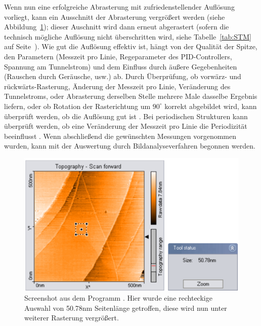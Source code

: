Wenn nun eine erfolgreiche Abrasterung mit zufriedenstellender
Auflösung vorliegt, kann ein Ausschnitt der Abrasterung
vergrößert werden (siehe Abbildung~\ref{fig:zoom});
dieser Auschnitt wird dann erneut abgerastert
(sofern die technisch mögliche Auflösung nicht überschritten wird,
siehe Tabelle~\ref{tab:STM} auf Seite~\pageref{tab:STM}).
Wie gut die Auflösung effektiv ist, hängt von der Qualität der 
Spitze, den Parametern (Messzeit pro Linie, Regeparameter des
PID-Controllers, Spannung am Tunnelstrom) und dem Einfluss durch
äußere Gegebenheiten (Rauschen durch Geräusche, usw.) ab. 
Durch Überprüfung, ob vorwärz- und rückwärts-Rasterung,
Änderung der Messzeit pro Linie, Veränderung des Tunnelstroms,
oder Abrasterung derselben Stelle mehrere Male  
dasselbe Ergebnis liefern, oder ob Rotation der Rasterichtung
um $90^{\circ}$ korrekt abgebildet wird, kann überprüft werden,
ob die Auflösung gut ist \cite{versuchsanleitung}.
Bei periodischen Strukturen kann überprüft werden, ob eine
Veränderung der Messzeit pro Linie die Periodizität beeinflusst
\cite{versuchsanleitung}. Wenn abschließend die gewünschten
Messungen vorgenommen wurden, kann mit der Auswertung 
durch Bildanalyseverfahren begonnen werden. 
\begin{figure}
\includegraphics[width=14cm]{pics/zoom}
\caption{Screenshot aus dem Programm \cite{easyscan2_STM}.
Hier wurde eine rechteckige Auswahl von 50.78nm Seitenlänge
getroffen, diese wird nun unter weiterer Rasterung vergrößert.}
 \label{fig:zoom}
\end{figure}


